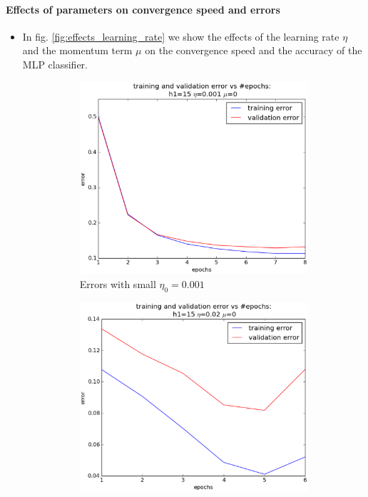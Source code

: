 \paragraph{Effects of parameters on convergence speed and errors}
\begin{itemize}
	\item In fig. \ref{fig:effects_learning_rate} we show the effects of the learning rate $\eta$ and the momentum term $\mu$ on the convergence speed and the accuracy of the MLP classifier. 
		\begin{figure}[!ht]
		\centering
		\begin{subfigure}[b]{.45\textwidth}
		\centering
		\includegraphics[width=\textwidth]{mlp/plots/effect_eta_small.eps}
		\caption{Errors with small $\eta_0=0.001$}
		\label{fig:small_eta}
		\end{subfigure}
		\quad
		\begin{subfigure}[b]{.45\textwidth}
		\centering
		\includegraphics[width=\textwidth]{mlp/plots/effect_eta_larger.eps}

\end{subfigure}
\end{figure}
\end{itemize}
